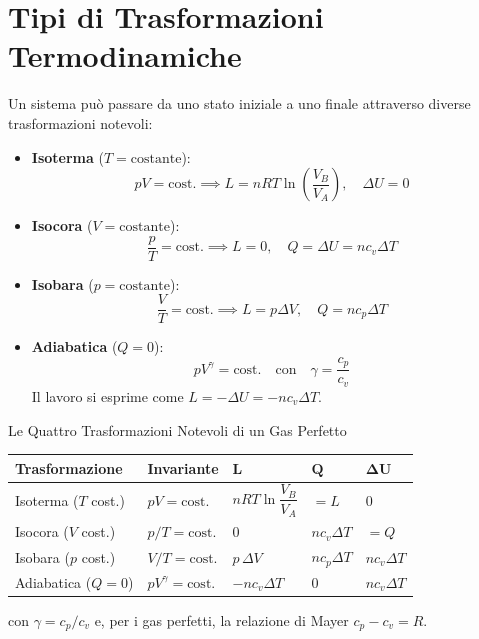 \section{Tipi di Trasformazioni Termodinamiche}
Un sistema può passare da uno stato iniziale a uno finale attraverso diverse trasformazioni notevoli:
\begin{itemize}
    \item \textbf{Isoterma} ($T = \text{costante}$): 
    \begin{equation}
        p V = \text{cost.} \implies L = n R T \ln\left(\frac{V_B}{V_A}\right), \quad \Delta U = 0
    \end{equation}
    
    \item \textbf{Isocora} ($V = \text{costante}$):
    \begin{equation}
        \frac{p}{T} = \text{cost.} \implies L = 0, \quad Q = \Delta U = n c_v \Delta T
    \end{equation}
    
    \item \textbf{Isobara} ($p = \text{costante}$):
    \begin{equation}
        \frac{V}{T} = \text{cost.} \implies L = p \Delta V, \quad Q = n c_p \Delta T
    \end{equation}
    
    \item \textbf{Adiabatica} ($Q = 0$):
    \begin{equation}
        p V^\gamma = \text{cost.} \quad \text{con} \quad \gamma = \frac{c_p}{c_v}
    \end{equation}
    Il lavoro si esprime come $L = -\Delta U = -n c_v \Delta T$.
\end{itemize}

\begin{formulario}{Le Quattro Trasformazioni Notevoli di un Gas Perfetto}
\centering
\renewcommand{\arraystretch}{1.6}
\begin{tabular}{@{}l l l l l@{}}
\toprule
\textbf{Trasformazione} & \textbf{Invariante} & $\boldsymbol{L}$ & $\boldsymbol{Q}$ & $\boldsymbol{\Delta U}$ \\
\midrule
Isoterma ($T$ cost.)   & $pV = \text{cost.}$          & $nRT \ln\dfrac{V_B}{V_A}$ & $= L$              & $0$ \\
Isocora ($V$ cost.)    & $p/T = \text{cost.}$         & $0$                       & $n c_v \Delta T$   & $= Q$ \\
Isobara ($p$ cost.)    & $V/T = \text{cost.}$         & $p \, \Delta V$           & $n c_p \Delta T$   & $n c_v \Delta T$ \\
Adiabatica ($Q = 0$)   & $pV^{\gamma} = \text{cost.}$ & $-n c_v \Delta T$         & $0$                & $n c_v \Delta T$ \\
\bottomrule
\end{tabular}
\vspace{4pt}

\raggedright
con $\gamma = c_p/c_v$ e, per i gas perfetti, la relazione di Mayer $c_p - c_v = R$.
\end{formulario}

